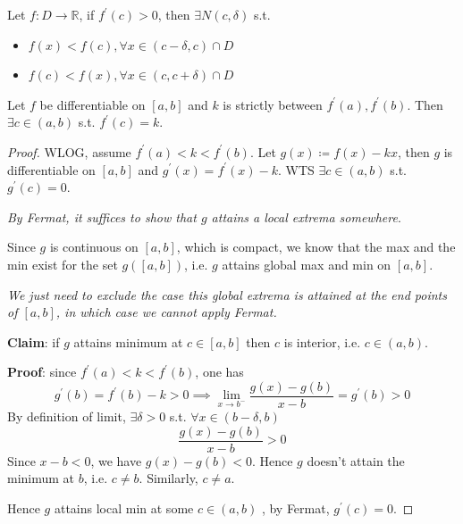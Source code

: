 \begin{proposition}
    Let $f: D \to \mathbb{R}$,
    if
    $f^{\prime}(c) > 0$, 
    then $\exists N(c, \delta)$ s.t. 
    \begin{itemize}
        \item $f(x) < f(c), \forall x \in (c - \delta, c) \cap D$
        \item $f(c) < f(x), \forall x \in (c, c + \delta) \cap D$
    \end{itemize} 
\end{proposition}


\begin{theorem}
    \label{thm:IVT-for-derivatives}
    Let $f$ be differentiable on $[a,b]$ and 
    $k$ is strictly between $f^{\prime}(a), f^{\prime}(b)$.
    Then $\exists c \in (a, b)$ s.t. 
    $f^{\prime}(c) = k$.
\end{theorem}

\begin{proof}
    WLOG, assume $f^{\prime}(a) < k < f^{\prime}(b)$.
    Let $g(x) \coloneq f(x) - kx$, 
    then $g$ is differentiable on $[a,b]$
    and $g^{\prime}(x) = f^{\prime}(x) - k$. 
    WTS $\exists c \in (a, b)$ s.t. $g^{\prime}(c) = 0$.
    \medskip 

    \textit{By Fermat, it suffices to show that $g$ attains a local extrema somewhere}.
    \medskip 

    Since $g$ is continuous on $[a,b]$, which is compact, we know 
    that the max and the min exist for the set $g([a, b])$,
    i.e. $g$ attains global max and min on $[a,b]$.
    \medskip

    \textit{We just need to exclude the case this global extrema
    is attained at the end points of $[a,b]$, in which case
    we cannot apply Fermat.
    }
    \medskip

    \textbf{Claim}: if $g$ attains minimum at $c \in [a,b]$
    then $c$ is interior, i.e. $c \in (a, b)$.

    \textbf{Proof}: since $f^{\prime}(a) < k < f^{\prime}(b)$,
    one has 
    \[
        g^{\prime}(b) = f^{\prime}(b) - k > 0 
        \implies
        \lim_{x \to b^{-}} \frac{g(x) - g(b)}{x-b} = g^{\prime}(b) > 0
    \]
    By definition of limit, $\exists \delta > 0$ s.t. 
    $\forall x \in (b - \delta, b)$
    \[
        \frac{g(x) - g(b)}{x-b} > 0
    \]
    Since $x - b < 0$, we have $g(x) - g(b) < 0$.
    Hence $g$ doesn't attain the minimum at $b$,
    i.e. $c \neq b$. Similarly, $c \neq a$.
    \medskip

    Hence $g$ attains local min at some $c \in \left( a,b \right) $ ,
    by Fermat, $g^{\prime}(c) = 0$.
\end{proof}


